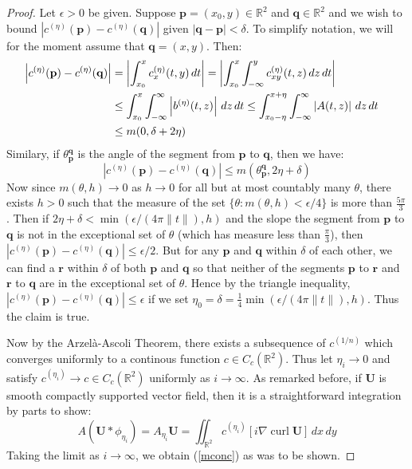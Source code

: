 \documentclass{amsart}
\newcommand{\R}			{\mathbb R}
\newcommand{\U}			{\mathbf U}
\newcommand{\p}			{\mathbf p}
\newcommand{\q}			{\mathbf q}
\newcommand{\rr}		{\mathbf r}
\newcommand{\grad}		{\nabla}
\newcommand{\curl}		{\operatorname{curl}}
\numberwithin{equation}{section}
\begin{document}
\begin{proof}
Let $\epsilon>0$ be given.  Suppose $\p=(x_0,y)\in\R^2$ and 
$\q\in\R^2$ and we wish to bound 
$|c^{(\eta)}(\p)-c^{(\eta)}(\q)|$ given $|\q-\p|<\delta$.  
To simplify notation, we will for the moment assume 
that $\q=(x,y)$.  Then:
\begin{equation}
\begin{split}
\left|c^{(\eta)}(\p)-c^{(\eta)}(\q)\right|&=\left|\int_{x_0}^xc^{(\eta)}_x(t,y)\,dt\right|
=\left|\int_{x_0}^x\int_{-\infty}^yc^{(\eta)}_{xy}(t,z)\,dz\,dt\right|\cr
&\leq\int_{x_0}^x\int_{-\infty}^\infty\left|b^{(\eta)}(t,z)\right|\,dz\,dt
\leq\int_{x_0-\eta}^{x+\eta}\int_{-\infty}^\infty\left|A(t,z)\right|\,dz\,dt\cr
&\leq m(0,\delta+2\eta)
\end{split}
\end{equation}
Similary, if $\theta_\p^\q$ is the angle of the segment from 
$\p$ to $\q$, then we have:
\begin{equation}
\left|c^{(\eta)}(\p)-c^{(\eta)}(\q)\right|\leq m(\theta_\p^\q,2\eta+\delta)
\end{equation}
Now since $m(\theta,h)\to 0$ as $h\to 0$ for all but at most 
countably many $\theta$, there exists $h>0$ such that the 
measure of the set $\{\theta:m(\theta,h)<\epsilon/4\}$ 
is more than $\frac{5\pi}3$.  Then if $2\eta+\delta<
\min(\epsilon/(4\pi\|t\|),h)$ and the slope the segment from 
$\p$ to $\q$ is not in the exceptional set of $\theta$ 
(which has measure less than $\frac\pi 3$), 
then $|c^{(\eta)}(\p)-c^{(\eta)}(\q)|\leq\epsilon/2$.  But 
for any $\p$ and $\q$ within $\delta$ of each other, 
we can find a $\rr$ within $\delta$ of both $\p$ and 
$\q$ so that neither of the segments $\p$ to $\rr$ and 
$\rr$ to $\q$ are in the exceptional set of $\theta$.  
Hence by the triangle inequality, 
$|c^{(\eta)}(\p)-c^{(\eta)}(\q)|\leq\epsilon$ if we set 
$\eta_0=\delta=\frac 14\min(\epsilon/(4\pi\|t\|),h)$.  
Thus the claim is true.

Now by the Arzel\`a-Ascoli Theorem, there exists a 
subsequence of $c^{(1/n)}$ which converges uniformly 
to a continous function $c\in C_c(\R^2)$.  Thus let 
$\eta_i\to 0$ and satisfy $c^{(\eta_i)}\to c\in C_c(\R^2)$ 
uniformly as $i\to\infty$.  As remarked before, if $\U$ 
is smooth compactly supported vector field, then it is 
a straightforward integration by parts to show:
\begin{equation}
A(\U*\phi_{\eta_i})=A_{\eta_i}\U=\iint_{\R^2}c^{(\eta_i)}[i\grad\curl\U]\,dx\,dy
\end{equation}
Taking the limit as $i\to\infty$, we obtain (\ref{mconc}) 
as was to be shown.
\end{proof}
\end{document}
